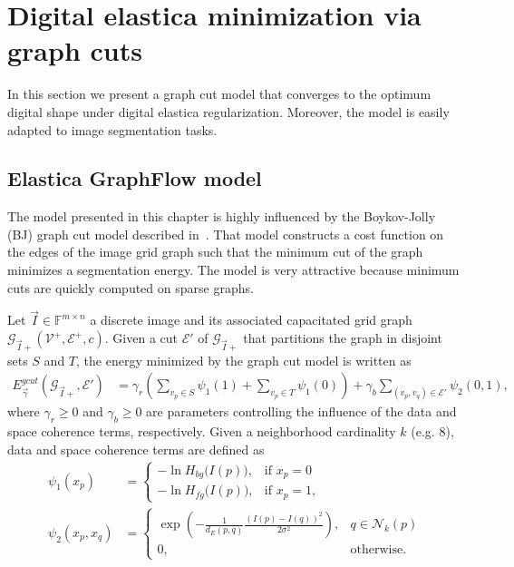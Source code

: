 \documentclass[runningheads]{llncs}
\newcommand{\GGe}{ \mathcal{G}_{\vec{I}+} }
\begin{document}
\section{Digital elastica minimization via graph cuts}
In this section we present a graph cut model that converges to the optimum digital shape under digital elastica
regularization. Moreover, the model is easily adapted to image segmentation tasks.


\subsection{Elastica GraphFlow model}
The model presented in this chapter is highly influenced by the Boykov-Jolly (BJ) graph cut model described in~\cite{boykov01graphcut}.
That model constructs a cost function on the edges of the image grid graph such that the minimum cut of the graph
minimizes a segmentation energy. The model is very attractive because minimum cuts are quickly computed on sparse
graphs.

Let $\vec{I} \in \mathbb{F}^{m \times n}$ a discrete image and its associated capacitated grid graph $\GGe (\mathcal{V}^+,\mathcal{E}^+,c)$. Given a cut $\mathcal{E}'$ of $\GGe$ that partitions the graph in disjoint sets $S$ and $T$, the energy minimized by the graph cut model is written as
\begin{align*}
	E^{gcut}_{\vec{\gamma}}(\GGe,\mathcal{E}') &= \gamma_r \left( \sum_{v_p \in S}{ \psi_1(1) } +\sum_{v_p \in T}{\psi_1(0)} \right) + \gamma_b \sum_{(v_p,v_q) \in \mathcal{E}'}{\psi_2(0,1)},
\end{align*}
where $\gamma_r \geq 0$ and $\gamma_b \geq 0$ are parameters controlling the influence of the data and space coherence terms, respectively. Given a neighborhood cardinality $k$ (e.g. $8$), data and space coherence terms are defined as
\begin{align*}
	\psi_1(x_p) &= \left\{ \begin{array}{ll}
	-\ln  H_{bg}\big( I(p) \big), & \text{if } x_p=0  \\[1em]	
	-\ln  H_{fg}\big( I(p) \big), & \text{if } x_p=1,
	\end{array}\right.\\[1em]
	\psi_{2}(x_p,x_q) &= \left\{ \begin{array}{ll}
	\displaystyle \exp{ \left(- \frac{1}{d_E(p,q)}\frac{(I(p) - I(q))^2}{2\sigma^2} \right) }, & q \in \mathcal{N}_k(p) \\[1em]
	0, & \text{otherwise}.
	\end{array}\right.
\end{align*}
\end{document}
